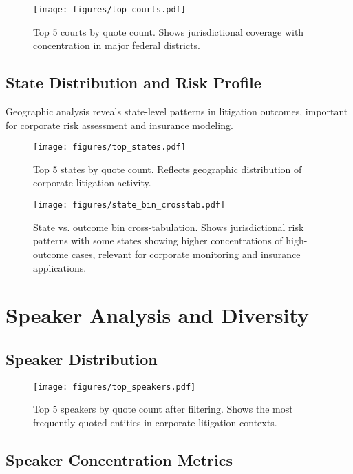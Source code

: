 \documentclass[11pt]{article}
\begin{document}
\begin{figure}[H]
\centering
\texttt{[image: figures/top\_courts.pdf]}
\caption{Top 5 courts by quote count. Shows jurisdictional coverage with concentration in major federal districts.}
\end{figure}

\subsection{State Distribution and Risk Profile}

Geographic analysis reveals state-level patterns in litigation outcomes, important for corporate risk assessment and insurance modeling.

\begin{figure}[H]
\centering
\texttt{[image: figures/top\_states.pdf]}
\caption{Top 5 states by quote count. Reflects geographic distribution of corporate litigation activity.}
\end{figure}

\begin{figure}[H]
\centering
\texttt{[image: figures/state\_bin\_crosstab.pdf]}
\caption{State vs. outcome bin cross-tabulation. Shows jurisdictional risk patterns with some states showing higher concentrations of high-outcome cases, relevant for corporate monitoring and insurance applications.}
\end{figure}

\section{Speaker Analysis and Diversity}

\subsection{Speaker Distribution}

\begin{figure}[H]
\centering
\texttt{[image: figures/top\_speakers.pdf]}
\caption{Top 5 speakers by quote count after filtering. Shows the most frequently quoted entities in corporate litigation contexts.}
\end{figure}

\subsection{Speaker Concentration Metrics}
\end{document}
